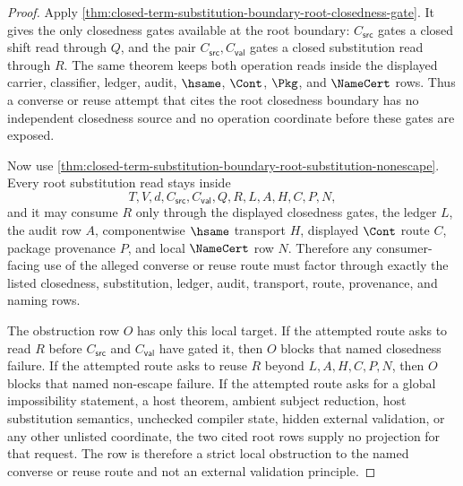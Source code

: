\begin{proof}
Apply \autoref{thm:closed-term-substitution-boundary-root-closedness-gate}. It gives the only closedness gates available at the root boundary: $C_{\mathsf{src}}$ gates a closed shift read through $Q$, and the pair $C_{\mathsf{src}},C_{\mathsf{val}}$ gates a closed substitution read through $R$. The same theorem keeps both operation reads inside the displayed carrier, classifier, ledger, audit, $\hsame$, $\Cont$, $\Pkg$, and $\NameCert$ rows. Thus a converse or reuse attempt that cites the root closedness boundary has no independent closedness source and no operation coordinate before these gates are exposed.

Now use \autoref{thm:closed-term-substitution-boundary-root-substitution-nonescape}. Every root substitution read stays inside
$$
T,V,d,C_{\mathsf{src}},C_{\mathsf{val}},Q,R,L,A,H,C,P,N,
$$
and it may consume $R$ only through the displayed closedness gates, the ledger $L$, the audit row $A$, componentwise $\hsame$ transport $H$, displayed $\Cont$ route $C$, package provenance $P$, and local $\NameCert$ row $N$. Therefore any consumer-facing use of the alleged converse or reuse route must factor through exactly the listed closedness, substitution, ledger, audit, transport, route, provenance, and naming rows.

The obstruction row $O$ has only this local target. If the attempted route asks to read $R$ before $C_{\mathsf{src}}$ and $C_{\mathsf{val}}$ have gated it, then $O$ blocks that named closedness failure. If the attempted route asks to reuse $R$ beyond $L,A,H,C,P,N$, then $O$ blocks that named non-escape failure. If the attempted route asks for a global impossibility statement, a host theorem, ambient subject reduction, host substitution semantics, unchecked compiler state, hidden external validation, or any other unlisted coordinate, the two cited root rows supply no projection for that request. The row is therefore a strict local obstruction to the named converse or reuse route and not an external validation principle.
\end{proof}

